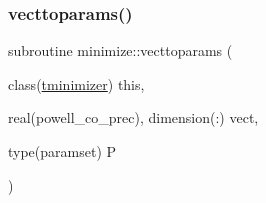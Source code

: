 \subsubsection{\texorpdfstring{vecttoparams()}{vecttoparams()}}
{\footnotesize\ttfamily subroutine minimize\+::vecttoparams (\begin{DoxyParamCaption}\item[{class(\mbox{\hyperlink{structminimize_1_1tminimizer}{tminimizer}})}]{this,  }\item[{real(powell\+\_\+co\+\_\+prec), dimension(\+:)}]{vect,  }\item[{type(paramset)}]{P }\end{DoxyParamCaption})\hspace{0.3cm}{\ttfamily [private]}}

